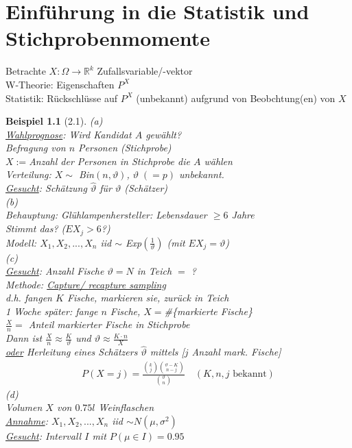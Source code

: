 \documentclass[a4paper,openany]{book}
\theoremstyle{mytheoremstyle}
\newtheorem*{bei}{Beispiel}
\theoremstyle{mytheoremstyle2}
\begin{document}
\chapter{Einführung in die Statistik und Stichprobenmomente}
\noindent Betrachte $X:\Omega \to \mathbb{R}^k$ Zufallsvariable/-vektor \\
W-Theorie: Eigenschaften $P^X$ \\
Statistik: Rückschlüsse auf $P^X$ (unbekannt) aufgrund von Beobchtung(en) von $X$  
\begin{bei}[2.1]
  (a) \\
  \underline{Wahlprognose}: Wird Kandidat $A$ gewählt? \\
  Befragung von $n$ Personen (Stichprobe) \\
  $X:=$Anzahl der Personen in Stichprobe die $A$ wählen \\
  Verteilung: $X\sim$ Bin$(n,\vartheta)$, $\vartheta\;(=p)$ unbekannt. \\
  \underline{Gesucht}: Schätzung $\hat{\vartheta}$ für $\vartheta$ (Schätzer) \\
  (b)\\
  Behauptung: Glühlampenhersteller: Lebensdauer $\geq 6$ Jahre \\
  Stimmt das? ($EX_j>6$?) \\
  Modell: $X_1,X_2,...,X_n$ iid $\sim$ Exp$(\frac{1}{\vartheta})$ (mit $EX_j=\vartheta$) \\
  (c)\\
 \underline{Gesucht}: Anzahl Fische $\vartheta=N$ in Teich $=$ ? \\
  Methode: \underline{Capture/ recapture sampling} \\
  d.h. fangen $K$ Fische, markieren sie, zurück in Teich \\
  1 Woche später: fange $n$ Fische, $X=$\#\{markierte Fische\} \\
  $\frac{X}{n}=$ Anteil markierter Fische in Stichprobe \\
  Dann ist $\frac{X}{n}\approx \frac{K}{\vartheta}$ und $\vartheta \approx \frac{K \cdot n}{X}$ \\
  \underline{oder} Herleitung eines Schätzers $\hat{\vartheta}$ mittels [$j$ Anzahl mark. Fische]
  \begin{align*}
    P(X=j)=\frac{\binom{k}{j}\binom{\vartheta-K}{n-j}}{\binom{\vartheta}{n}}\quad (K,n,j\text{ bekannt})
  \end{align*}
  (d)\\
  Volumen $X$ von $0.75l$ Weinflaschen \\
  \underline{Annahme}: $X_1,X_2,...,X_n$ iid $\sim N(\mu ,\sigma ^2)$ \\
  \underline{Gesucht}: Intervall $I$ mit $P(\mu \in I)=0.95$  
\end{bei}
\end{document}
